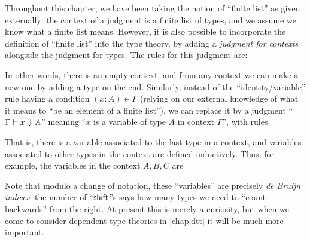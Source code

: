 \begin{rmk}\label{rmk:ctx-judgment}
  Throughout this chapter, we have been taking the notion of ``finite list'' as given externally: the context of a judgment is a finite list of types, and we assume we know what a finite list means.
  However, it is also possible to incorporate the definition of ``finite list'' into the type theory, by adding a \emph{judgment for contexts} alongside the judgment for types.
  The rules for this judgment are:
  In other words, there is an empty context, and from any context we can make a new one by adding a type on the end.
  Similarly, instead of the ``identity/variable'' rule having a condition $(x:A)\in \Gamma$ (relying on our external knowledge of what it means to ``be an element of a finite list''), we can replace it by a judgment ``$\Gamma \vdash x\mathrel{\Downarrow} A$'' meaning ``$x$ is a variable of type $A$ in context $\Gamma$'', with rules
  That is, there is a variable associated to the last type in a context, and variables associated to other types in the context are defined inductively.
  Thus, for example, the variables in the context $A,B,C$ are
  Note that modulo a change of notation, these ``variables'' are precisely \emph{de Bruijn indices}: the number of ``$\mathsf{shift}$''s says how many types we need to ``count backwards'' from the right.
  At present this is merely a curiosity, but when we come to consider dependent type theories in \cref{chap:dtt} it will be much more important.
\end{rmk}


